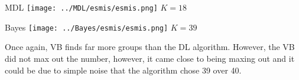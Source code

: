 \begin{minipage}{0.45\linewidth}
MDL
\centering
\texttt{[image: ../MDL/esmis/esmis.png]}
$K=18$

\end{minipage}
\begin{minipage}{0.45\linewidth}
Bayes
\centering
\texttt{[image: ../Bayes/esmis/esmis.png]}
$K=39$
\end{minipage}
\vspace{10pt}

Once again, VB finds far more groups than the DL algorithm. However, the VB
did not max out the number, however, it came close to being maxing out and
it could be due to simple noise that the algorithm chose 39 over 40.
